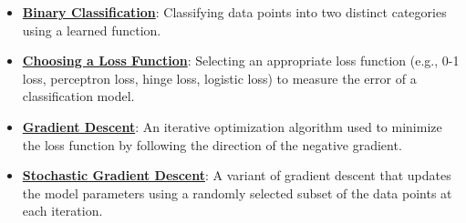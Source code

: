 \documentclass{article}%
\begin{document}
\begin{itemize}[leftmargin=*]
\item \href{https://purdue.brightspace.com/d2l/common/assets/pdfjs-d2l-dist/1.0.14-legacy/web/viewer.html?file=\%2Fcontent\%2Fenforced\%2F1095467-wl.202510.CS.24300.001\%2F05L2-ML Basics.pdf\%3Fou\%3D1095467\&lang=en-us\&container=d2l-fileviewer-rendered-pdf\&fullscreen=d2l-fileviewer-rendered-pdf-dialog\&height=667#page=20}{\textbf{Binary Classification}}: Classifying data points into two distinct categories using a learned function.%
\item \href{https://purdue.brightspace.com/d2l/common/assets/pdfjs-d2l-dist/1.0.14-legacy/web/viewer.html?file=\%2Fcontent\%2Fenforced\%2F1095467-wl.202510.CS.24300.001\%2F05L2-ML Basics.pdf\%3Fou\%3D1095467\&lang=en-us\&container=d2l-fileviewer-rendered-pdf\&fullscreen=d2l-fileviewer-rendered-pdf-dialog\&height=667#page=25}{\textbf{Choosing a Loss Function}}: Selecting an appropriate loss function (e.g., 0{-}1 loss, perceptron loss, hinge loss, logistic loss) to measure the error of a classification model.%
\item \href{https://purdue.brightspace.com/d2l/common/assets/pdfjs-d2l-dist/1.0.14-legacy/web/viewer.html?file=\%2Fcontent\%2Fenforced\%2F1095467-wl.202510.CS.24300.001\%2F05L2-ML Basics.pdf\%3Fou\%3D1095467\&lang=en-us\&container=d2l-fileviewer-rendered-pdf\&fullscreen=d2l-fileviewer-rendered-pdf-dialog\&height=667#page=28}{\textbf{Gradient Descent}}: An iterative optimization algorithm used to minimize the loss function by following the direction of the negative gradient.%
\item \href{https://purdue.brightspace.com/d2l/common/assets/pdfjs-d2l-dist/1.0.14-legacy/web/viewer.html?file=\%2Fcontent\%2Fenforced\%2F1095467-wl.202510.CS.24300.001\%2F05L2-ML Basics.pdf\%3Fou\%3D1095467\&lang=en-us\&container=d2l-fileviewer-rendered-pdf\&fullscreen=d2l-fileviewer-rendered-pdf-dialog\&height=667#page=29}{\textbf{Stochastic Gradient Descent}}: A variant of gradient descent that updates the model parameters using a randomly selected subset of the data points at each iteration.%
\end{itemize}

%
\end{document}
